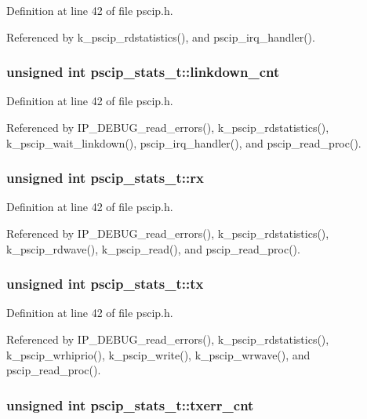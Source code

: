 Definition at line 42 of file pscip.h.

Referenced by k\_\-pscip\_\-rdstatistics(), and pscip\_\-irq\_\-handler().\hypertarget{structpscip__stats__t_47a332aa892c703c615e8beb8ad8db09}{
\subsubsection[{linkdown\_\-cnt}]{\setlength{\rightskip}{0pt plus 5cm}unsigned int {\bf pscip\_\-stats\_\-t::linkdown\_\-cnt}}}
\label{structpscip__stats__t_47a332aa892c703c615e8beb8ad8db09}




Definition at line 42 of file pscip.h.

Referenced by IP\_\-DEBUG\_\-read\_\-errors(), k\_\-pscip\_\-rdstatistics(), k\_\-pscip\_\-wait\_\-linkdown(), pscip\_\-irq\_\-handler(), and pscip\_\-read\_\-proc().\hypertarget{structpscip__stats__t_e46adfbf3c7f0a63c6c9674c3c4be6be}{
\subsubsection[{rx}]{\setlength{\rightskip}{0pt plus 5cm}unsigned int {\bf pscip\_\-stats\_\-t::rx}}}
\label{structpscip__stats__t_e46adfbf3c7f0a63c6c9674c3c4be6be}




Definition at line 42 of file pscip.h.

Referenced by IP\_\-DEBUG\_\-read\_\-errors(), k\_\-pscip\_\-rdstatistics(), k\_\-pscip\_\-rdwave(), k\_\-pscip\_\-read(), and pscip\_\-read\_\-proc().\hypertarget{structpscip__stats__t_4aea32dc480a098e93826eb3ee1ef8e0}{
\subsubsection[{tx}]{\setlength{\rightskip}{0pt plus 5cm}unsigned int {\bf pscip\_\-stats\_\-t::tx}}}
\label{structpscip__stats__t_4aea32dc480a098e93826eb3ee1ef8e0}




Definition at line 42 of file pscip.h.

Referenced by IP\_\-DEBUG\_\-read\_\-errors(), k\_\-pscip\_\-rdstatistics(), k\_\-pscip\_\-wrhiprio(), k\_\-pscip\_\-write(), k\_\-pscip\_\-wrwave(), and pscip\_\-read\_\-proc().\hypertarget{structpscip__stats__t_462f1b9d8580e9540a8080cbdf9cb8d9}{
\subsubsection[{txerr\_\-cnt}]{\setlength{\rightskip}{0pt plus 5cm}unsigned int {\bf pscip\_\-stats\_\-t::txerr\_\-cnt}}}
\label{structpscip__stats__t_462f1b9d8580e9540a8080cbdf9cb8d9}




